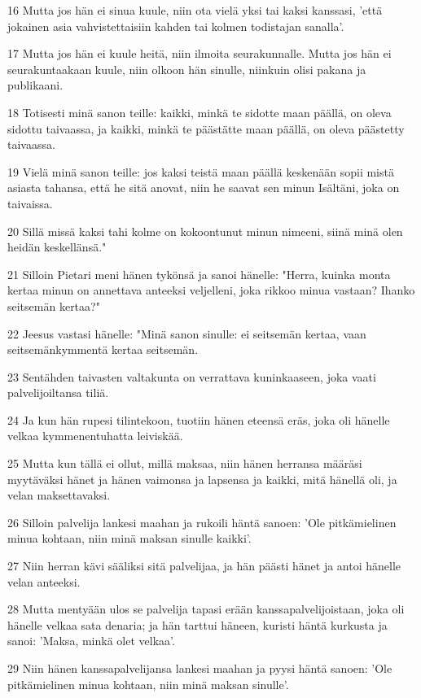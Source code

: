 \par 16 Mutta jos hän ei sinua kuule, niin ota vielä yksi tai kaksi kanssasi, 'että jokainen asia vahvistettaisiin kahden tai kolmen todistajan sanalla'.
\par 17 Mutta jos hän ei kuule heitä, niin ilmoita seurakunnalle. Mutta jos hän ei seurakuntaakaan kuule, niin olkoon hän sinulle, niinkuin olisi pakana ja publikaani.
\par 18 Totisesti minä sanon teille: kaikki, minkä te sidotte maan päällä, on oleva sidottu taivaassa, ja kaikki, minkä te päästätte maan päällä, on oleva päästetty taivaassa.
\par 19 Vielä minä sanon teille: jos kaksi teistä maan päällä keskenään sopii mistä asiasta tahansa, että he sitä anovat, niin he saavat sen minun Isältäni, joka on taivaissa.
\par 20 Sillä missä kaksi tahi kolme on kokoontunut minun nimeeni, siinä minä olen heidän keskellänsä."
\par 21 Silloin Pietari meni hänen tykönsä ja sanoi hänelle: "Herra, kuinka monta kertaa minun on annettava anteeksi veljelleni, joka rikkoo minua vastaan? Ihanko seitsemän kertaa?"
\par 22 Jeesus vastasi hänelle: "Minä sanon sinulle: ei seitsemän kertaa, vaan seitsemänkymmentä kertaa seitsemän.
\par 23 Sentähden taivasten valtakunta on verrattava kuninkaaseen, joka vaati palvelijoiltansa tiliä.
\par 24 Ja kun hän rupesi tilintekoon, tuotiin hänen eteensä eräs, joka oli hänelle velkaa kymmenentuhatta leiviskää.
\par 25 Mutta kun tällä ei ollut, millä maksaa, niin hänen herransa määräsi myytäväksi hänet ja hänen vaimonsa ja lapsensa ja kaikki, mitä hänellä oli, ja velan maksettavaksi.
\par 26 Silloin palvelija lankesi maahan ja rukoili häntä sanoen: 'Ole pitkämielinen minua kohtaan, niin minä maksan sinulle kaikki'.
\par 27 Niin herran kävi sääliksi sitä palvelijaa, ja hän päästi hänet ja antoi hänelle velan anteeksi.
\par 28 Mutta mentyään ulos se palvelija tapasi erään kanssapalvelijoistaan, joka oli hänelle velkaa sata denaria; ja hän tarttui häneen, kuristi häntä kurkusta ja sanoi: 'Maksa, minkä olet velkaa'.
\par 29 Niin hänen kanssapalvelijansa lankesi maahan ja pyysi häntä sanoen: 'Ole pitkämielinen minua kohtaan, niin minä maksan sinulle'.

